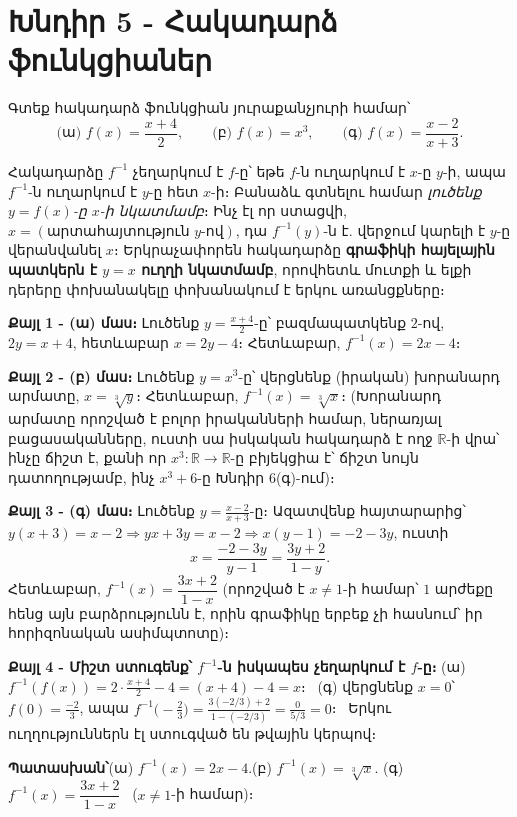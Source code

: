 \documentclass[11pt,a4paper]{article}
\newcommand{\R}{\mathbb{R}}
\newcommand{\answer}[1]{\begin{answerbox}\centering\textbf{Պատասխան՝}\quad #1\end{answerbox}}
\begin{document}
\section*{Խնդիր 5 - Հակադարձ ֆունկցիաներ}

\begin{problembox}[5]
Գտեք հակադարձ ֆունկցիան յուրաքանչյուրի համար՝
\[
\text{(ա) } f(x)=\frac{x+4}{2},\qquad
\text{(բ) } f(x)=x^3,\qquad
\text{(գ) } f(x)=\frac{x-2}{x+3}.
\]
\end{problembox}

\begin{ideabox}
Հակադարձը $f^{-1}$ չեղարկում է $f$-ը՝ եթե $f$-ն ուղարկում է $x$-ը $y$-ի, ապա $f^{-1}$-ն ուղարկում է
$y$-ը հետ $x$-ի։ Բանաձև գտնելու համար \emph{լուծենք $y=f(x)$-ը $x$-ի նկատմամբ}։ Ինչ էլ որ
ստացվի, $x=(\text{արտահայտություն }y\text{-ով})$, դա $f^{-1}(y)$-ն է. վերջում կարելի է $y$-ը
վերանվանել $x$։ Երկրաչափորեն հակադարձը \textbf{գրաֆիկի հայելային պատկերն է $y=x$ ուղղի
նկատմամբ}, որովհետև մուտքի և ելքի դերերը փոխանակելը փոխանակում է երկու առանցքները։
\end{ideabox}

\textbf{Քայլ 1 - (ա) մաս։} Լուծենք $y=\tfrac{x+4}{2}$-ը՝ բազմապատկենք $2$-ով, $2y=x+4$, հետևաբար $x=2y-4$։
Հետևաբար, $f^{-1}(x)=2x-4$։

\textbf{Քայլ 2 - (բ) մաս։} Լուծենք $y=x^3$-ը՝ վերցնենք (իրական) խորանարդ արմատը, $x=\sqrt[3]{y}$։ Հետևաբար,
$f^{-1}(x)=\sqrt[3]{x}$։ (Խորանարդ արմատը որոշված է բոլոր իրականների համար, ներառյալ բացասականները,
ուստի սա իսկական հակադարձ է ողջ $\R$-ի վրա՝ ինչը ճիշտ է, քանի որ $x^3:\R\to\R$-ը բիյեկցիա է՝
ճիշտ նույն դատողությամբ, ինչ $x^3+6$-ը Խնդիր 6(գ)-ում)։

\textbf{Քայլ 3 - (գ) մաս։} Լուծենք $y=\tfrac{x-2}{x+3}$-ը։ Ազատվենք հայտարարից՝
$y(x+3)=x-2\Rightarrow yx+3y=x-2\Rightarrow x(y-1)=-2-3y$, ուստի
\[
x=\frac{-2-3y}{y-1}=\frac{3y+2}{1-y}.
\]
Հետևաբար, $f^{-1}(x)=\dfrac{3x+2}{1-x}$ (որոշված է $x\ne1$-ի համար՝ $1$ արժեքը հենց այն բարձրությունն է,
որին գրաֆիկը երբեք չի հասնում՝ իր հորիզոնական ասիմպտոտը)։

\textbf{Քայլ 4 - Միշտ ստուգենք՝ $f^{-1}$-ն իսկապես չեղարկում է $f$-ը։}
(ա) $f^{-1}(f(x))=2\cdot\tfrac{x+4}{2}-4=(x+4)-4=x$։ \checkmark\
(գ) վերցնենք $x=0$՝ $f(0)=\tfrac{-2}{3}$, ապա $f^{-1}\!\bigl(-\tfrac23\bigr)
=\tfrac{3(-2/3)+2}{1-(-2/3)}=\tfrac{0}{5/3}=0$։ \checkmark\ Երկու ուղղություններն էլ ստուգված են
թվային կերպով։

\answer{(ա) $f^{-1}(x)=2x-4$.\quad (բ) $f^{-1}(x)=\sqrt[3]{x}$.\quad
(գ) $f^{-1}(x)=\dfrac{3x+2}{1-x}$ \ ($x\ne1$-ի համար)։}
\end{document}

